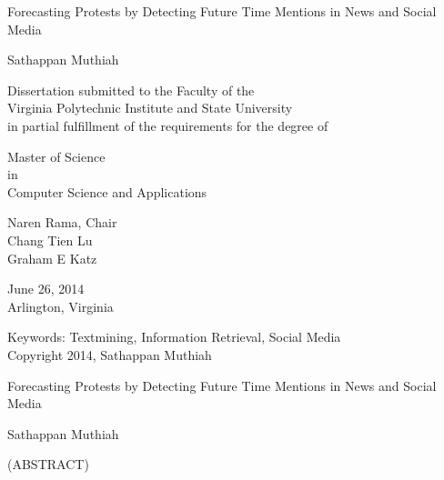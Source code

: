 \documentclass[10pt]{report}
\begin{document}
\thispagestyle{empty}

\newcommand{\then}{\Rightarrow}
\newcommand{\softor}{\operatornamewithlimits{\tilde{\vee}}}
\newcommand{\softand}{\operatornamewithlimits{\tilde{\wedge}}}
\newcommand{\softthen}{\operatornamewithlimits{\tilde{\then}}}
\newcommand{\softneg}{\operatornamewithlimits{\tilde{\neg}}}

\begin{center}

{\Large
    Forecasting Protests by Detecting Future Time Mentions in News and Social Media
}

\vfill

Sathappan Muthiah
\vfill

Dissertation submitted to the Faculty of the \\
Virginia Polytechnic Institute and State University \\
in partial fulfillment of the requirements for the degree of

\vfill

Master of Science\\
in \\
Computer Science and Applications

\vfill

Naren Rama, Chair \\
Chang Tien Lu \\
Graham E Katz \\

\vfill

June 26, 2014 \\
Arlington, Virginia

\vfill

Keywords: Textmining, Information Retrieval, Social Media
\\
Copyright 2014, Sathappan Muthiah

\end{center}

\pagebreak

\thispagestyle{empty}
\begin{center}

{\large Forecasting Protests by Detecting Future Time Mentions in News and Social Media
}

\vfill

Sathappan Muthiah

\vfill

(ABSTRACT)

\vfill

\end{center}
\end{document}

